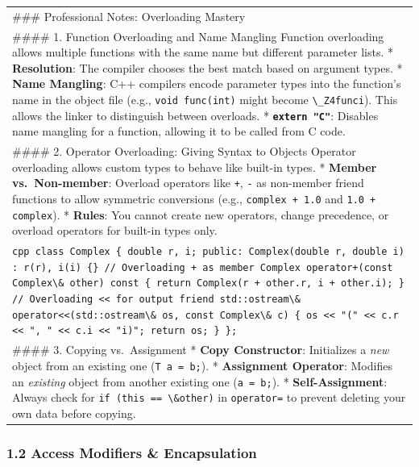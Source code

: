 \begin{longtable}[]{@{}
  >{\raggedright\arraybackslash}p{}@{}}
\toprule
\endhead
\#\#\# Professional Notes: Overloading Mastery \\
\#\#\#\# 1. Function Overloading and Name Mangling Function overloading
allows multiple functions with the same name but different parameter
lists. * \textbf{Resolution}: The compiler chooses the best match based
on argument types. * \textbf{Name Mangling}: C++ compilers encode
parameter types into the function's name in the object file (e.g.,
\passthrough{\lstinline!void func(int)!} might become
\passthrough{\lstinline!\_Z4funci!}). This allows the linker to
distinguish between overloads. *
\textbf{\passthrough{\lstinline!extern "C"!}}: Disables name mangling
for a function, allowing it to be called from C code. \\
\#\#\#\# 2. Operator Overloading: Giving Syntax to Objects Operator
overloading allows custom types to behave like built-in types. *
\textbf{Member vs.~Non-member}: Overload operators like
\passthrough{\lstinline!+!}, \passthrough{\lstinline!-!} as non-member
friend functions to allow symmetric conversions (e.g.,
\passthrough{\lstinline!complex + 1.0!} and
\passthrough{\lstinline!1.0 + complex!}). * \textbf{Rules}: You cannot
create new operators, change precedence, or overload operators for
built-in types only. \\
\passthrough{\lstinline!cpp class Complex \{ double r, i; public: Complex(double r, double i) : r(r), i(i) \{\} // Overloading + as member Complex operator+(const Complex\& other) const \{ return Complex(r + other.r, i + other.i); \} // Overloading << for output friend std::ostream\& operator<<(std::ostream\& os, const Complex\& c) \{ os << "(" << c.r << ", " << c.i << "i)"; return os; \} \};!} \\
\#\#\#\# 3. Copying vs.~Assignment * \textbf{Copy Constructor}:
Initializes a \emph{new} object from an existing one
(\passthrough{\lstinline!T a = b;!}). * \textbf{Assignment Operator}:
Modifies an \emph{existing} object from another existing one
(\passthrough{\lstinline!a = b;!}). * \textbf{Self-Assignment}: Always
check for \passthrough{\lstinline!if (this == \&other)!} in
\passthrough{\lstinline!operator=!} to prevent deleting your own data
before copying. \\
\bottomrule
\end{longtable}

\hypertarget{access-modifiers-encapsulation}{%
\subsubsection{1.2 Access Modifiers \&
Encapsulation}\label{access-modifiers-encapsulation}}

